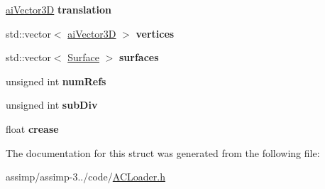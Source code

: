 \begin{DoxyCompactItemize}
\item 
\hypertarget{struct_assimp_1_1_a_c3_d_importer_1_1_object_a2c73645cecdaafefc7582704127ae3a8}{\hyperlink{structai_vector3_d}{ai\+Vector3\+D} {\bfseries translation}}\label{struct_assimp_1_1_a_c3_d_importer_1_1_object_a2c73645cecdaafefc7582704127ae3a8}

\item 
\hypertarget{struct_assimp_1_1_a_c3_d_importer_1_1_object_ab79f494b5e7eb71df825f295d6dea64a}{std\+::vector$<$ \hyperlink{structai_vector3_d}{ai\+Vector3\+D} $>$ {\bfseries vertices}}\label{struct_assimp_1_1_a_c3_d_importer_1_1_object_ab79f494b5e7eb71df825f295d6dea64a}

\item 
\hypertarget{struct_assimp_1_1_a_c3_d_importer_1_1_object_afa9c08d4afdc801bd46cd2d9dc0201cd}{std\+::vector$<$ \hyperlink{struct_assimp_1_1_a_c3_d_importer_1_1_surface}{Surface} $>$ {\bfseries surfaces}}\label{struct_assimp_1_1_a_c3_d_importer_1_1_object_afa9c08d4afdc801bd46cd2d9dc0201cd}

\item 
\hypertarget{struct_assimp_1_1_a_c3_d_importer_1_1_object_af0ddfa4a602c7d9da956e2e00620ef2b}{unsigned int {\bfseries num\+Refs}}\label{struct_assimp_1_1_a_c3_d_importer_1_1_object_af0ddfa4a602c7d9da956e2e00620ef2b}

\item 
\hypertarget{struct_assimp_1_1_a_c3_d_importer_1_1_object_a3f398b16fc66755bffbf99aa27967196}{unsigned int {\bfseries sub\+Div}}\label{struct_assimp_1_1_a_c3_d_importer_1_1_object_a3f398b16fc66755bffbf99aa27967196}

\item 
\hypertarget{struct_assimp_1_1_a_c3_d_importer_1_1_object_a9d59dd9c4e17472ce512f7a7e94a824e}{float {\bfseries crease}}\label{struct_assimp_1_1_a_c3_d_importer_1_1_object_a9d59dd9c4e17472ce512f7a7e94a824e}

\end{DoxyCompactItemize}


The documentation for this struct was generated from the following file\+:\begin{DoxyCompactItemize}
\item 
assimp/assimp-\/3../code/\hyperlink{_a_c_loader_8h}{A\+C\+Loader.\+h}\end{DoxyCompactItemize}
